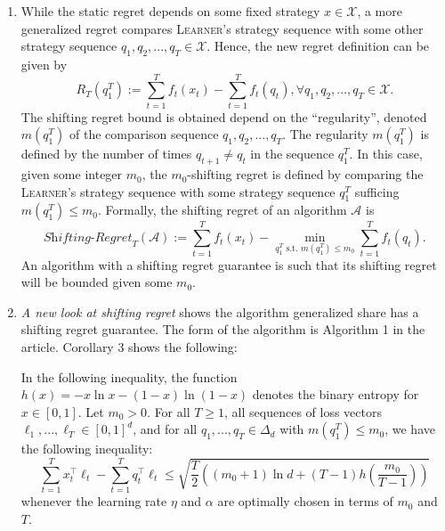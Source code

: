 \documentclass[a4paper, 12pt]{article}
\begin{document}
\begin{enumerate}
  \item While the static regret depends on some fixed strategy $x \in \mathscr{X}$, a more generalized regret compares \textsc{Learner}'s strategy sequence with some other strategy sequence $q_1, q_2, ..., q_T \in \mathscr{X}$. Hence, the new regret definition can be given by
        \[R_T(q_1^T) := \sum_{t=1}^T f_t(x_t) - \sum_{t=1}^T f_t(q_t), \forall q_1, q_2, ..., q_T \in \mathscr{X}.\]
        The shifting regret bound is obtained depend on the ``regularity'', denoted $m(q_1^T)$ of the comparison sequence $q_1, q_2, ..., q_T$. The regularity $m(q_1^T)$ is defined by the number of times $q_{t+1} \neq q_t$ in the sequence $q_1^T$. In this case, given some integer $m_0$, the $m_0$-shifting regret is defined by comparing the \textsc{Learner}'s strategy sequence with some strategy sequence $q_1^T$ sufficing $m(q_1^T) \leq m_0$. Formally, the shifting regret of an algorithm $\mathcal{A}$ is
        \[\textit{Shifting-Regret}_T(\mathcal{A}) := \sum_{t=1}^T f_t(x_t) - \min_{q_1^T \text{ s.t. } m(q_1^T) \leq m_0}\sum_{t=1}^T f_t(q_t).\]
        An algorithm with a shifting regret guarantee is such that its shifting regret will be bounded given some $m_0$.
  \item \textit{A new look at shifting regret}\cite{cesa2012new} shows the algorithm generalized share has a shifting regret guarantee. The form of the algorithm is Algorithm 1 in the article. Corollary 3 shows the following:

        In the following inequality, the function $h(x) = -x \ln x - (1-x)\ln(1-x)$ denotes the binary entropy for $x \in [0, 1]$. Let $m_0 > 0$. For all $T \geq 1$, all sequences of loss vectors $\ell_1, ..., \ell_T \in [0, 1]^d$, and for all $q_1, ..., q_T \in \Delta_d$ with $m(q_1^T) \leq m_0$, we have the following inequality:
        \[\sum_{t=1}^T x_t^\top \ell_t - \sum_{t=1}^T q_t^\top \ell_t \leq \sqrt{\frac{T}{2}\left((m_0 + 1) \ln d + (T-1)h\left(\frac{m_0}{T-1}\right)\right)} \]
        whenever the learning rate $\eta$ and $\alpha$ are optimally chosen in terms of $m_0$ and $T$.


\end{enumerate}
\end{document}
